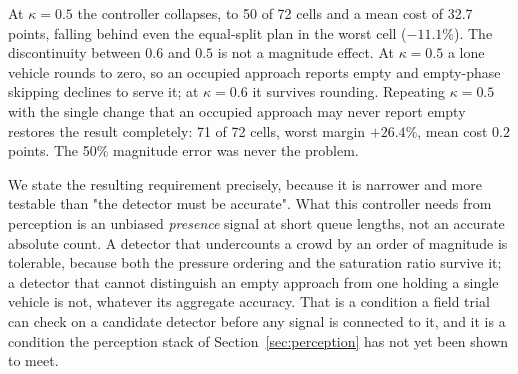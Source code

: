 At $\kappa = 0.5$ the controller collapses, to 50 of 72 cells and a mean cost of 32.7 points,
falling behind even the equal-split plan in the worst cell ($-11.1\%$). The discontinuity
between $0.6$ and $0.5$ is not a magnitude effect. At $\kappa = 0.5$ a lone vehicle rounds to
zero, so an occupied approach reports empty and empty-phase skipping declines to serve it; at
$\kappa = 0.6$ it survives rounding. Repeating $\kappa = 0.5$ with the single change that an
occupied approach may never report empty restores the result completely: 71 of 72 cells, worst
margin $+26.4\%$, mean cost $0.2$ points. The 50\% magnitude error was never the problem.

We state the resulting requirement precisely, because it is narrower and more testable than
"the detector must be accurate". What this controller needs from perception is an unbiased
\emph{presence} signal at short queue lengths, not an accurate absolute count. A detector that
undercounts a crowd by an order of magnitude is tolerable, because both the pressure ordering
and the saturation ratio survive it; a detector that cannot distinguish an empty approach from
one holding a single vehicle is not, whatever its aggregate accuracy. That is a condition a
field trial can check on a candidate detector before any signal is connected to it, and it is a
condition the perception stack of Section~\ref{sec:perception} has not yet been shown to meet.
